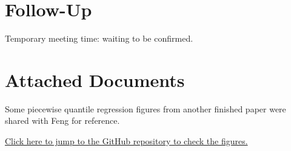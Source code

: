 \documentclass[11pt]{article}
\begin{document}
\section*{Follow-Up}
Temporary meeting time: waiting to be confirmed.

\section{Attached Documents}
Some piecewise quantile regression figures from another finished paper were shared with Feng for reference.

\href{URL}{Click here to jump to the GitHub repository to check the figures.}
\end{document}
